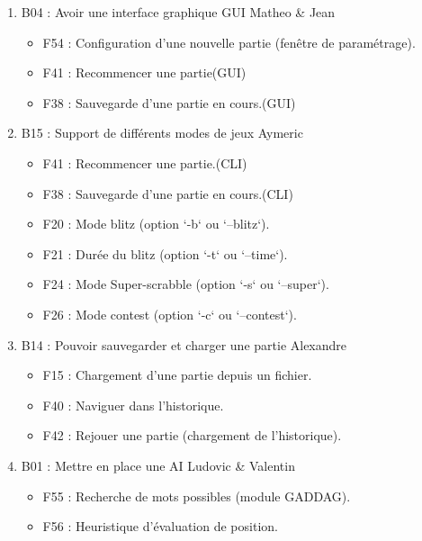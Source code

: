 \documentclass[a4paper,12pt]{article}
\begin{document}
\begin{enumerate}
  \item B04 : Avoir une interface graphique GUI\newline
  Matheo \& Jean
  \begin{itemize}
    \item F54 : Configuration d’une nouvelle partie (fenêtre de paramétrage).
    \item F41 : Recommencer une partie(GUI)
    \item F38 : Sauvegarde d’une partie en cours.(GUI)
  \end{itemize}
  \item B15 : Support de différents modes de jeux\newline
  Aymeric
  \begin{itemize}
    \item F41 : Recommencer une partie.(CLI)
    \item F38 : Sauvegarde d’une partie en cours.(CLI)
    \item F20 : Mode blitz (option `-b` ou `--blitz`).
    \item F21 : Durée du blitz (option `-t` ou `--time`).
    \item F24 : Mode Super-scrabble (option `-s` ou `--super`).
    \item F26 : Mode contest (option `-c` ou `--contest`).
  \end{itemize}
  \item B14 : Pouvoir sauvegarder et charger une partie\newline
  Alexandre
  \begin{itemize}
    \item F15 : Chargement d’une partie depuis un fichier.
    \item F40 : Naviguer dans l’historique.
    \item F42 : Rejouer une partie (chargement de l’historique).
  \end{itemize}
  \item B01 : Mettre en place une AI\newline
  Ludovic \& Valentin
  \begin{itemize}
    \item F55 : Recherche de mots possibles (module GADDAG).
    \item F56 : Heuristique d’évaluation de position.\newline
  \end{itemize}
\end{enumerate}
\end{document}
